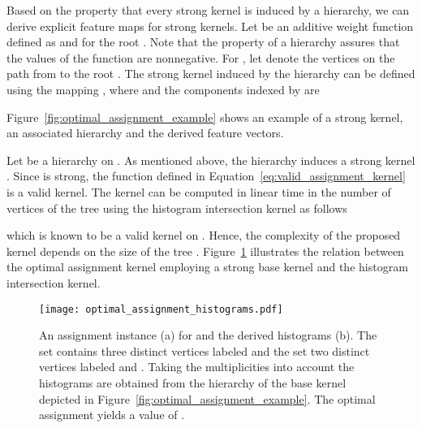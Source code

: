 \documentclass[twoside,11pt]{article}
\begin{document}
Based on the property that every strong kernel is induced by a hierarchy, we can derive explicit feature maps for strong kernels.
Let  be an additive weight function defined as  and  for the root .
Note that the property of a hierarchy assures that the values of the  function are nonnegative.
For , let  denote the vertices on the path from  to the root .
The strong kernel  induced by the hierarchy  can be defined using the mapping , where  and the components indexed by  are

Figure~\ref{fig:optimal_assignment_example} shows an example of a strong kernel, an associated hierarchy and the derived feature vectors.

Let  be a hierarchy on .
As mentioned above, the hierarchy  induces a strong kernel .
Since  is strong, the function  defined in Equation~\ref{eq:valid_assignment_kernel} is a valid kernel.
The kernel  can be computed in linear time in the number of vertices  of the tree  using the histogram intersection kernel  as follows

which is known to be a valid kernel on  .
Hence, the complexity of the proposed kernel depends on the size of the tree .
Figure~\ref{fig:optimal_assignment_histograms} illustrates the relation between the optimal assignment kernel employing a strong base kernel and the histogram intersection kernel.
\begin{figure}[t]
  \centering
  \texttt{[image: optimal\_assignment\_histograms.pdf]}
  \caption{An assignment instance (a) for  and the derived histograms (b). The set  contains three distinct vertices labeled  and the set  two distinct vertices labeled  and . Taking the multiplicities into account the histograms are obtained from the hierarchy of the base kernel  depicted in Figure~\ref{fig:optimal_assignment_example}.  The optimal assignment yields a value of .}
  \label{fig:optimal_assignment_histograms}
\end{figure}
\end{document}

